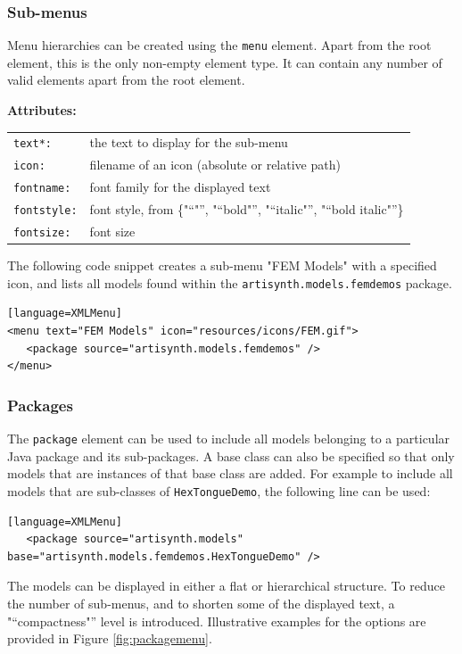 \documentclass{article}
\newcommand{\openquot}{\iflatexml"\else``\fi}
\newcommand{\closequot}{\iflatexml"\else''\fi}
\newcommand{\quot}[1]{\openquot#1\closequot}
\begin{document}
\subsubsection{Sub-menus}

Menu hierarchies can be created using the {\tt menu} element.  Apart from the
root element, this is the only non-empty element type.  It can contain any
number of valid elements apart from the root element.

\noindent \textbf{Attributes:}\\
\begin{tabular}{ll}
   {\tt text*:} & the text to display for the sub-menu\\
   {\tt icon:} & filename of an icon (absolute or relative path)\\
   {\tt fontname:} & font family for the displayed text\\
   {\tt fontstyle:} & font style, from \{\quot{}, \quot{bold}, \quot{italic},
      \quot{bold italic}\}\\
   {\tt fontsize:} & font size
\end{tabular}
\medskip

The following code snippet creates a sub-menu "FEM Models" with a specified
icon, and lists all models found within the {\tt artisynth.models.femdemos} 
package.
\begin{lstlisting}[][language=XMLMenu]
<menu text="FEM Models" icon="resources/icons/FEM.gif">
   <package source="artisynth.models.femdemos" />
</menu>
\end{lstlisting}

\subsubsection{Packages}

The {\tt package} element can be used to include all models belonging to
a particular Java package and its sub-packages.  A base class can also be 
specified so that only models that are instances of that base class are added.
For example to include all models that are sub-classes of {\tt HexTongueDemo}, the
following line can be used:
\begin{lstlisting}[][language=XMLMenu]
   <package source="artisynth.models" base="artisynth.models.femdemos.HexTongueDemo" />
\end{lstlisting}
\medskip

The models can be displayed in either a flat or hierarchical structure.  To
reduce the number of sub-menus, and to shorten some of the displayed text, a 
\quot{compactness} level is introduced.  Illustrative examples for the options
are provided in Figure \ref{fig:packagemenu}.
\end{document}
